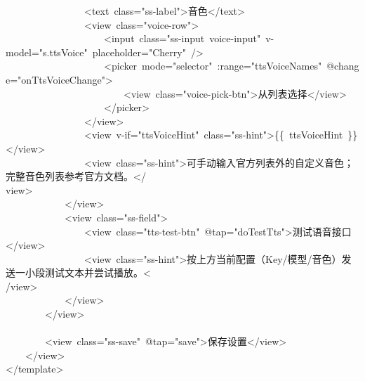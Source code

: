 \documentclass[a4paper,10pt]{article}
\begin{document}
{~~~~~~~~~~~~~~~~<text~class="ss-label">音色</text>\\
~~~~~~~~~~~~~~~~<view~class="voice-row">\\
~~~~~~~~~~~~~~~~~~~~<input~class="ss-input~voice-input"~v-model="s.ttsVoice"~placeholder="Cherry"~/>\\
~~~~~~~~~~~~~~~~~~~~<picker~mode="selector"~:range="ttsVoiceNames"~@change="onTtsVoiceChange">\\
~~~~~~~~~~~~~~~~~~~~~~~~<view~class="voice-pick-btn">从列表选择</view>\\
~~~~~~~~~~~~~~~~~~~~</picker>\\
~~~~~~~~~~~~~~~~</view>\\
~~~~~~~~~~~~~~~~<view~v-if="ttsVoiceHint"~class="ss-hint">\{\{~ttsVoiceHint~\}\}</view>\\
~~~~~~~~~~~~~~~~<view~class="ss-hint">可手动输入官方列表外的自定义音色；完整音色列表参考官方文档。</\\
view>\\
~~~~~~~~~~~~</view>\\
~~~~~~~~~~~~<view~class="ss-field">\\
~~~~~~~~~~~~~~~~<view~class="tts-test-btn"~@tap="doTestTts">测试语音接口</view>\\
~~~~~~~~~~~~~~~~<view~class="ss-hint">按上方当前配置（Key/模型/音色）发送一小段测试文本并尝试播放。<\\
/view>\\
~~~~~~~~~~~~</view>\\
~~~~~~~~</view>\\
\mbox{}\\
~~~~~~~~<view~class="ss-save"~@tap="save">保存设置</view>\\
~~~~</view>\\
</template>\\
\mbox{}
}

\newpage
\end{document}
